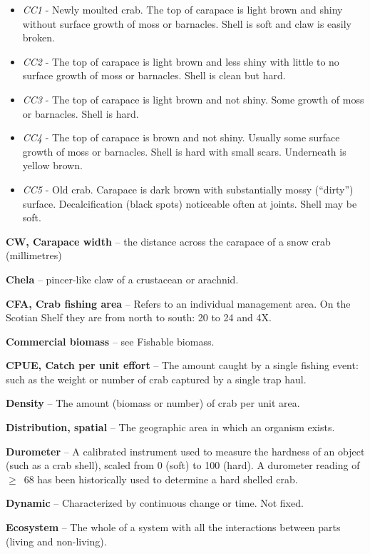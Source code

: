 \documentclass[11pt]{article}
\begin{document}
\begin{itemize}
\item  \textit{CC1} - Newly moulted crab. The top of carapace is light brown and shiny without surface growth of moss or barnacles. Shell is soft and claw is easily broken.
\item  \textit{CC2} - The top of carapace is light brown and less shiny with little to no surface growth of moss or barnacles. Shell is clean but hard.
\item  \textit{CC3} - The top of carapace is light brown and not shiny. Some growth of moss or barnacles. Shell is hard.
\item  \textit{CC4} - The top of carapace is brown and not shiny. Usually some surface growth of moss or barnacles. Shell is hard with small scars. Underneath is yellow brown.
\item  \textit{CC5} - Old crab. Carapace is dark brown with substantially mossy (``dirty'') surface. Decalcification (black spots) noticeable often at joints. Shell may be soft.
\end{itemize}

\textbf{CW, Carapace width} -- the distance across the carapace of a snow crab (millimetres)

\textbf{Chela} -- pincer-like claw of a crustacean or arachnid.

\textbf{CFA, Crab fishing area} -- Refers to an individual management area. On the Scotian Shelf they are from north to south: 20 to 24 and 4X.

\textbf{Commercial biomass} -- see Fishable biomass.

\textbf{CPUE, Catch per unit effort} -- The amount caught by a single fishing event: such as the weight or number of crab captured by a single trap haul.

\textbf{Density} -- The amount (biomass or number) of crab per unit area.

\textbf{Distribution, spatial} -- The geographic area in which an organism exists.

\textbf{Durometer} -- A calibrated instrument used to measure the hardness of an object (such as a crab shell), scaled from 0 (soft) to 100 (hard). A durometer reading of $\geq$~68 has been historically used to determine a hard shelled crab.

\textbf{Dynamic} -- Characterized by continuous change or time. Not fixed.

\textbf{Ecosystem} -- The whole of a system with all the interactions between parts (living and non-living).
\end{document}
